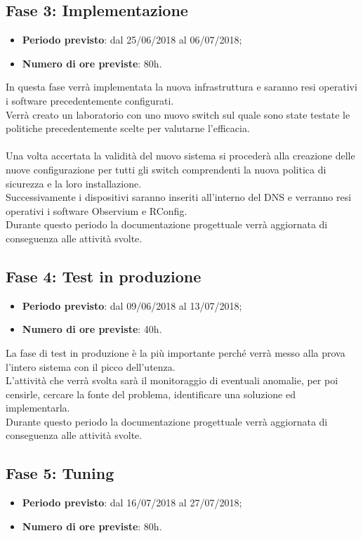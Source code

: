 \documentclass[Tesi.tex]{subfiles}
\begin{document}
\subsection{Fase 3: Implementazione}
\begin{itemize}
	\item \textbf{Periodo previsto}: dal 25/06/2018 al 06/07/2018;
	\item \textbf{Numero di ore previste}: 80h.
\end{itemize}
	
In questa fase verrà implementata la nuova infrastruttura e saranno resi operativi i software precedentemente configurati. \\
Verrà creato un laboratorio con uno nuovo switch sul quale sono state testate le politiche precedentemente scelte per valutarne l'efficacia.\\\\
Una volta accertata la validità del nuovo sistema si procederà alla creazione delle nuove configurazione per tutti gli switch comprendenti la nuova politica di sicurezza e la loro installazione. \\
Successivamente i dispositivi saranno inseriti all'interno del DNS e verranno resi operativi i software Observium e RConfig. \\
Durante questo periodo la documentazione progettuale verrà aggiornata di conseguenza alle attività svolte.


\subsection{Fase 4: Test in produzione}
\begin{itemize}
	\item \textbf{Periodo previsto}: dal 09/06/2018 al 13/07/2018;
	\item \textbf{Numero di ore previste}: 40h.
\end{itemize}
	
La fase di test in produzione è la più importante perché verrà messo alla prova l'intero sistema con il picco dell'utenza. \\
L'attività che verrà svolta sarà il monitoraggio di eventuali anomalie, per poi censirle, cercare la fonte del problema, identificare una soluzione ed implementarla. \\
Durante questo periodo la documentazione progettuale verrà aggiornata di conseguenza alle attività svolte.

	

\subsection{Fase 5: Tuning}
\begin{itemize}
	\item \textbf{Periodo previsto}: dal 16/07/2018 al 27/07/2018;
	\item \textbf{Numero di ore previste}: 80h.
\end{itemize}
	
\end{document}
